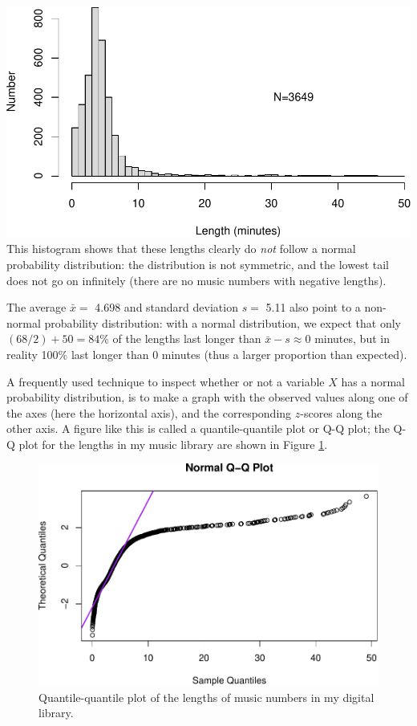 \documentclass[
]{book}
\begin{document}
\includegraphics{QMS-EN_files/figure-latex/itunestimeshist-1.pdf}
This histogram shows that these lengths clearly
do \emph{not} follow a normal probability distribution: the distribution is not
symmetric, and the lowest tail does not go on infinitely (there are
no music numbers with negative lengths).

The average \(\bar{x} =\) 4.698 and
standard deviation \(s =\) 5.11 also
point to a non-normal probability distribution:
with a normal distribution, we expect that only \((68/2)+50=84\)\% of the lengths
last longer than
\(\bar{x}-s\approx 0\) minutes, but in reality 100\% last longer
than 0 minutes (thus a larger proportion than expected).

A frequently used technique to inspect whether or not a variable \(X\) has a
normal probability distribution, is to make a graph with the
observed values along one of the axes (here the horizontal axis), and the
corresponding
\(z\)-scores
along the other axis. A figure like this is called a quantile-quantile plot or
Q-Q plot; the Q-Q plot for the lengths in my music library are shown in
Figure \ref{fig:itunestimesqqplot}.

\begin{figure}
\centering
\includegraphics{QMS-EN_files/figure-latex/itunestimesqqplot-1.pdf}
\caption{\label{fig:itunestimesqqplot}Quantile-quantile plot of the lengths of music numbers in my digital library.}
\end{figure}
\end{document}
